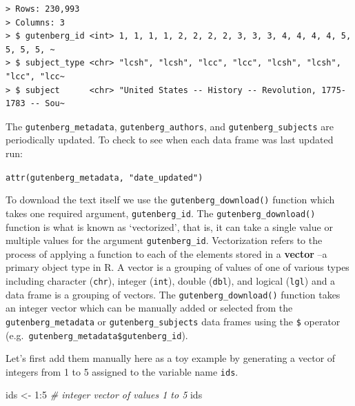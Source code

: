 \documentclass[
  letterpaper,
]{latex/krantz}
\newenvironment{Shaded}{\begin{snugshade}}{\end{snugshade}}
\newcommand{\CommentTok}[1]{\textcolor[rgb]{0.00,0.00,0.00}{\textit{#1}}}
\newcommand{\DecValTok}[1]{\textcolor[rgb]{0.00,0.00,0.00}{#1}}
\newcommand{\NormalTok}[1]{\textcolor[rgb]{0.00,0.00,0.00}{#1}}
\newcommand{\OtherTok}[1]{\textcolor[rgb]{0.00,0.00,0.00}{#1}}
\newcommand{\SpecialCharTok}[1]{\textcolor[rgb]{0.00,0.00,0.00}{#1}}
\begin{document}
\begin{verbatim}
> Rows: 230,993
> Columns: 3
> $ gutenberg_id <int> 1, 1, 1, 1, 2, 2, 2, 2, 3, 3, 3, 4, 4, 4, 4, 5, 5, 5, 5, ~
> $ subject_type <chr> "lcsh", "lcsh", "lcc", "lcc", "lcsh", "lcsh", "lcc", "lcc~
> $ subject      <chr> "United States -- History -- Revolution, 1775-1783 -- Sou~
\end{verbatim}

\begin{tcolorbox}[enhanced jigsaw, colframe=quarto-callout-warning-color-frame, titlerule=0mm, coltitle=black, colback=white, opacitybacktitle=0.6, colbacktitle=quarto-callout-warning-color!10!white, left=2mm, arc=.35mm, leftrule=.75mm, rightrule=.15mm, bottomtitle=1mm, toptitle=1mm, breakable, bottomrule=.15mm, title=\textcolor{quarto-callout-warning-color}{\faExclamationTriangle}\hspace{0.5em}{Tip}, toprule=.15mm, opacityback=0]

The \texttt{gutenberg\_metadata}, \texttt{gutenberg\_authors}, and
\texttt{gutenberg\_subjects} are periodically updated. To check to see
when each data frame was last updated run:

\texttt{attr(gutenberg\_metadata,\ "date\_updated")}

\end{tcolorbox}

To download the text itself we use the \texttt{gutenberg\_download()}
function which takes one required argument, \texttt{gutenberg\_id}. The
\texttt{gutenberg\_download()} function is what is known as
`vectorized', that is, it can take a single value or multiple values for
the argument \texttt{gutenberg\_id}. Vectorization refers to the process
of applying a function to each of the elements stored in a
\textbf{vector} --a primary object type in R. A vector is a grouping of
values of one of various types including character (\texttt{chr}),
integer (\texttt{int}), double (\texttt{dbl}), and logical
(\texttt{lgl}) and a data frame is a grouping of vectors. The
\texttt{gutenberg\_download()} function takes an integer vector which
can be manually added or selected from the \texttt{gutenberg\_metadata}
or \texttt{gutenberg\_subjects} data frames using the \texttt{\$}
operator (e.g.~\texttt{gutenberg\_metadata\$gutenberg\_id}).

Let's first add them manually here as a toy example by generating a
vector of integers from 1 to 5 assigned to the variable name
\texttt{ids}.

\begin{Shaded}
\begin{Highlighting}[]
\NormalTok{ids }\OtherTok{\textless{}{-}} \DecValTok{1}\SpecialCharTok{:}\DecValTok{5} \CommentTok{\# integer vector of values 1 to 5}
\NormalTok{ids}
\end{Highlighting}
\end{Shaded}
\end{document}
